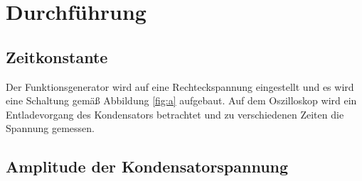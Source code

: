 \section{Durchführung}
\label{sec:Durchführung}
\subsection{Zeitkonstante}
Der Funktionsgenerator wird auf eine Rechteckspannung eingestellt und es wird eine Schaltung gemäß Abbildung \ref{fig:a}
aufgebaut. 
Auf dem Oszilloskop wird ein Entladevorgang des Kondensators betrachtet und zu verschiedenen Zeiten die Spannung gemessen.
\subsection{Amplitude der Kondensatorspannung}
